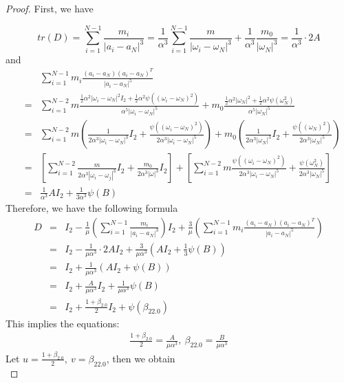 \documentclass[11pt]{article}
\begin{document}
 \begin{proof}
First, we have
 
 \begin{displaymath}
 tr(D)=\sum_{i=1}^{N-1}\frac{m_i}{|a_i-a_N|^3}  
 =\frac{1}{\alpha^3}\sum_{i=1}^{N-1}\frac{m}{|\omega_i-\omega_N|^3}+\frac{1}{\alpha^3}\frac{m_0}{|\omega_N|^3}
 =\frac{1}{\alpha^3}\cdot 2A
 \end{displaymath}
 and
 \begin{eqnarray*}
 	&&
 	\sum_{i=1}^{N-1}m_i\frac{(a_i-a_N)(a_i-a_N)^T}{|a_i-a_N|^5}
 	\\
 	&=&
 	\sum_{i=1}^{N-2}m\frac{\frac{1}{2}\alpha^2|\omega_i-\omega_N|^2I_2+\frac{1}{2}\alpha^2\psi((\omega_i-\omega_N)^2)}
 	{\alpha^5|\omega_i-\omega_ N|^5}+
 	m_0\frac{\frac{1}{2}\alpha^2|\omega_N|^2+\frac{1}{2}\alpha^2\psi(\omega_N^2)}{\alpha^5|\omega_N|^5}
 	\\
 	&=&
 	\sum_{i=1}^{N-2}m(\frac{1}{2\alpha^3|\omega_i-\omega_N|^3}I_2+\frac{\psi((\omega_i-\omega_N)^2)}{2\alpha^3|\omega_i-\omega_N|^5})+
 	m_0(\frac{1}{2\alpha^3|\omega_N|^3}I_2+\frac{\psi((\omega_N)^2)}{2\alpha^3|\omega_N|^5})\\
 	&=&
 	[\sum_{i=1}^{N-2}\frac{m}{2\alpha^3|\omega_i-\omega_j|^3}I_2+\frac{m_0}{2\alpha^3|\omega|^3}I_2]+
 	[\sum_{i=1}^{N-2}m\frac{\psi((\omega_i-\omega_N)^2)}{2\alpha^3|\omega_i-\omega_N|^5}+\frac{\psi(\omega_N^2)}{2\alpha^3|\omega_N|^5}]\\
 	&=&
 	\frac{1}{\alpha^3}AI_2+\frac{1}{3\alpha^3}\psi(B)
 \end{eqnarray*}
 Therefore, we have the following formula
 \begin{eqnarray*}
 	D&=&I_2-\frac{1}{\mu}(\sum_{i=1}^{N-1}\frac{m_i}{|a_i-a_N|^3})I_2+\frac{3}{\mu}(\sum_{i=1}^{N-1}m_i\frac{(a_i-a_N)(a_i-a_N)^T}{|a_i-a_N|^5})\\
 	&=&I_2-\frac{1}{\mu\alpha^3}\cdot 2AI_2+\frac{3}{\mu\alpha^3}(AI_2+\frac{1}{3}\psi(B))\\
 	&=&I_2+\frac{1}{\mu\alpha^3}(AI_2+\psi(B))\\
 	&=&I_2+\frac{A}{\mu\alpha^3}I_2+\frac{1}{\mu\alpha^3}\psi(B)\\
 	&=&I_2+\frac{1+\beta_{2.0}}{2}I_2+\psi(\beta_{22.0})
 \end{eqnarray*}
 This implies the equations:
 \begin{eqnarray*}
 	\frac{1+\beta_{2.0}}{2}=\frac{A}{\mu\alpha^3},\ 
 	\beta_{22.0}=\frac{B}{\mu\alpha^3}
 \end{eqnarray*}
 Let $u=\frac{1+\beta_{2.0}}{2},\  v=\beta_{22.0}$, then we obtain
 \begin{displaymath}

\end{displaymath}
\end{proof}
\end{document}
